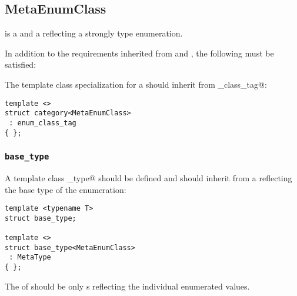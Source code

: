\subsection{MetaEnumClass}
\label{concept-MetaEnumClass}

 is a  and a  reflecting a strongly type enumeration.

In addition to the requirements inherited from  and , the following must
be satisfied:

The \verb@category@ template class specialization for a  should
inherit from \verb@enum_class_tag@:

\begin{verbatim}
template <>
struct category<MetaEnumClass>
 : enum_class_tag
{ };
\end{verbatim}

\subsubsection{\texttt{base\_type}}

A template class \verb@base_type@ should be defined and should inherit from
a  reflecting the base type of the enumeration:

\begin{verbatim}
template <typename T>
struct base_type;

template <>
struct base_type<MetaEnumClass>
 : MetaType
{ };
\end{verbatim}

The \verb@members@ of  should be only  s
reflecting the individual enumerated values.

